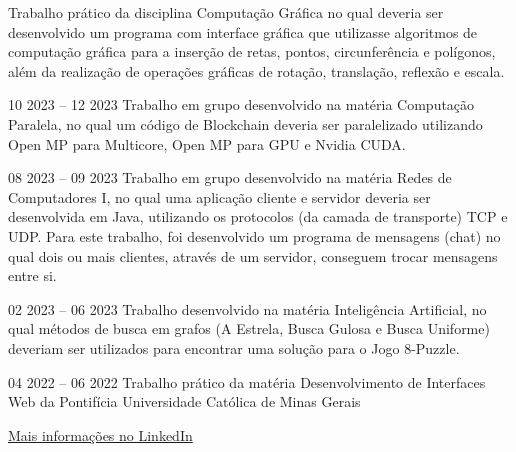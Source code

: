 Trabalho prático da disciplina Computação Gráfica no qual deveria ser desenvolvido um programa com interface gráfica que utilizasse algoritmos de computação gráfica para a inserção de retas, pontos, circunferência e polígonos, além da realização de operações gráficas de rotação, translação, reflexão e escala.\\
\divider

{
}{10 2023 -- 12 2023}{}
Trabalho em grupo desenvolvido na matéria Computação Paralela, no qual um código de Blockchain deveria ser paralelizado utilizando Open MP para Multicore, Open MP para GPU e Nvidia CUDA.\\
\divider

{
}{08 2023 -- 09 2023}{}
Trabalho em grupo desenvolvido na matéria Redes de Computadores I, no qual uma aplicação cliente e servidor deveria ser desenvolvida em Java, utilizando os protocolos (da camada de transporte) TCP e UDP. Para este trabalho, foi desenvolvido um programa de mensagens (chat) no qual dois ou mais clientes, através de um servidor, conseguem trocar mensagens entre si.\\
\divider
        
{
}{02 2023 -- 06 2023}{}
Trabalho desenvolvido na matéria Inteligência Artificial, no qual métodos de busca em grafos (A Estrela, Busca Gulosa e Busca Uniforme) deveriam ser utilizados para encontrar uma solução para o Jogo 8-Puzzle.\\
\divider

{
}{04 2022 -- 06 2022}{}
Trabalho prático da matéria Desenvolvimento de Interfaces Web da Pontifícia Universidade Católica de Minas Gerais\\
\divider

{\large\color{emphasis}\href{https://www.linkedin.com/in/henriquemcc/details/projects/}{Mais informações no LinkedIn}}